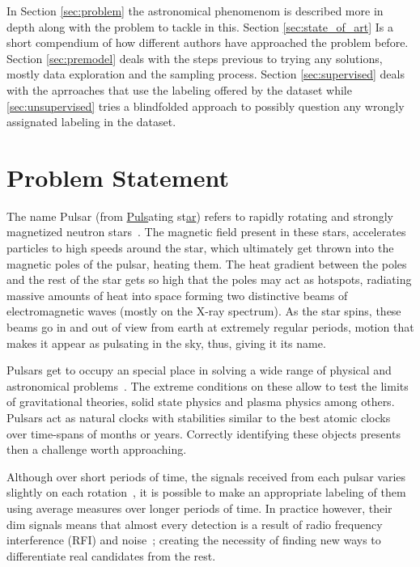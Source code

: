 \documentclass[journal]{IEEEtran}
\begin{document}
In Section \ref{sec:problem} the astronomical phenomenom is described more in
depth along with the problem to tackle in this. Section \ref{sec:state_of_art}
Is a short compendium of how different authors have approached the problem
before. Section \ref{sec:premodel} deals with the steps previous to trying any
solutions, mostly data exploration and the sampling process. Section
\ref{sec:supervised} deals with the aprroaches that use the labeling offered
by the dataset while \ref{sec:unsupervised} tries a blindfolded approach to
possibly question any wrongly assignated labeling in the dataset.

\section{Problem Statement\label{sec:problem}}

The name Pulsar (from \underline{Puls}ating st\underline{ar}) refers to rapidly
rotating and strongly magnetized neutron stars~\cite{pulsar:definition:nasa}.
The magnetic field present in these stars, accelerates particles to high speeds
around the star, which ultimately get thrown into the magnetic poles of the
pulsar, heating them. The heat gradient between the poles and the rest of the
star gets so high that the poles may act as hotspots, radiating massive amounts
of heat into space forming two distinctive beams of electromagnetic waves
(mostly on the X-ray spectrum). As the star spins, these beams go in and out of
view from earth at extremely regular periods, motion that makes it appear as
pulsating in the sky, thus, giving it its name.

Pulsars get to occupy an special place in solving a wide range of physical and
astronomical problems~\cite{pulsar:importance:kramer}. The extreme conditions on
these allow to test the limits of gravitational theories, solid state physics
and plasma physics among others. Pulsars act as natural clocks with stabilities
similar to the best atomic clocks over time-spans of months or years. Correctly
identifying these objects presents then a challenge worth approaching.

Although over short periods of time, the signals received from each pulsar
varies slightly on each rotation~\cite{pulsar:importance:kramer}, it is possible
to make an appropriate labeling of them using average measures over longer
periods of time. In practice however, their dim signals means that almost every
detection is a result of radio frequency interference (RFI) and
noise~\cite{pulsar:dataset:explanation:lyon}; creating the necessity of finding
new ways to differentiate real candidates from the rest.
\end{document}
